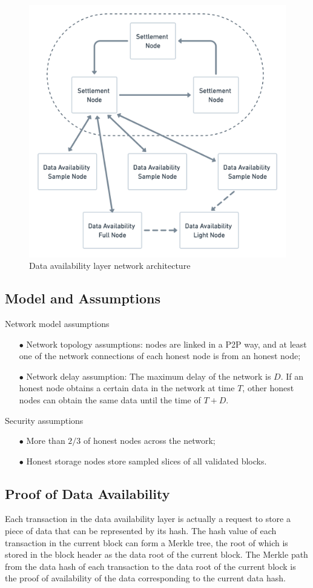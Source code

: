 \documentclass{iacrtrans}
\begin{document}
\begin{figure}[!htbp]
	\centering
	\includegraphics[width=0.7 \textwidth]{images/7.png}
	\caption{Data availability layer network architecture}
	\label{fig:7} 
\end{figure}



\subsection{Model and Assumptions}
Network model assumptions
\begin{itemize}
	\item[$\bullet$] Network topology assumptions: nodes are linked in a P2P way, and at least one of the network connections of each honest node is from an honest node;
	\item[$\bullet$] Network delay assumption: The maximum delay of the network is $D$. If an honest node obtains a certain data in the network at time $T$, other honest nodes can obtain the same data until the time of $T+D$.
\end{itemize}

Security assumptions
\begin{itemize}
	\item[$\bullet$] More than $2/3$ of honest nodes across the network;
	\item[$\bullet$] Honest storage nodes store sampled slices of all validated blocks.
\end{itemize}


\subsection{Proof of Data Availability}
Each transaction in the data availability layer is actually a request to store a piece of data that can be represented by its hash. The hash value of each transaction in the current block can form a Merkle tree, the root of which is stored in the block header as the data root of the current block. 
The Merkle path from the data hash of each transaction to the data root of the current block is the proof of availability of the data corresponding to the current data hash.
\end{document}

